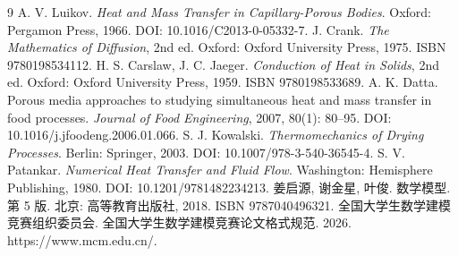 \documentclass[12pt,a4paper]{article}
\newcommand{\bibfont}{\fontsize{10.6pt}{15pt}\selectfont}
\begin{document}
\renewcommand{\refname}{{\heiti 八、}参考文献}
\begingroup
\bibfont
\begin{thebibliography}{9}
    A. V. Luikov. \textit{Heat and Mass Transfer in Capillary-Porous Bodies}. Oxford: Pergamon Press, 1966. DOI: 10.1016/C2013-0-05332-7.
    J. Crank. \textit{The Mathematics of Diffusion}, 2nd ed. Oxford: Oxford University Press, 1975. ISBN 9780198534112.
    H. S. Carslaw, J. C. Jaeger. \textit{Conduction of Heat in Solids}, 2nd ed. Oxford: Oxford University Press, 1959. ISBN 9780198533689.
    A. K. Datta. Porous media approaches to studying simultaneous heat and mass transfer in food processes. \textit{Journal of Food Engineering}, 2007, 80(1): 80--95. DOI: 10.1016/j.jfoodeng.2006.01.066.
    S. J. Kowalski. \textit{Thermomechanics of Drying Processes}. Berlin: Springer, 2003. DOI: 10.1007/978-3-540-36545-4.
    S. V. Patankar. \textit{Numerical Heat Transfer and Fluid Flow}. Washington: Hemisphere Publishing, 1980. DOI: 10.1201/9781482234213.
    姜启源, 谢金星, 叶俊. 数学模型. 第 5 版. 北京: 高等教育出版社, 2018. ISBN 9787040496321.
    全国大学生数学建模竞赛组织委员会. 全国大学生数学建模竞赛论文格式规范. 2026. https://www.mcm.edu.cn/.
\end{thebibliography}
\endgroup
\label{body:end}
\end{document}
